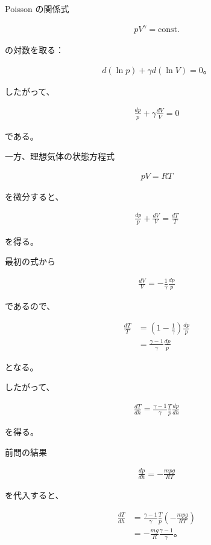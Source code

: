 \documentclass[platex,dvipdfmx,a4paper]{jsarticle}
\begin{document}
Poisson の関係式

\begin{align*}
pV^\gamma
=
\mathrm{const.}
\end{align*}

の対数を取る：

\begin{align*}
d(\ln p)
+
\gamma d(\ln V)
=
0。
\end{align*}

したがって、

\begin{align*}
\frac{dp}{p}
+
\gamma\frac{dV}{V}
=
0
\end{align*}

である。

一方、理想気体の状態方程式

\begin{align*}
pV=RT
\end{align*}

を微分すると、

\begin{align*}
\frac{dp}{p}
+
\frac{dV}{V}
=
\frac{dT}{T}
\end{align*}

を得る。

最初の式から

\begin{align*}
\frac{dV}{V}
=
-\frac1\gamma
\frac{dp}{p}
\end{align*}

であるので、

\begin{align*}
\frac{dT}{T}
&=
\left(
1-\frac1\gamma
\right)
\frac{dp}{p}
\\
&=
\frac{\gamma-1}{\gamma}
\frac{dp}{p}
\end{align*}

となる。

したがって、

\begin{align*}
\frac{dT}{dh}
=
\frac{\gamma-1}{\gamma}
\frac{T}{p}
\frac{dp}{dh}
\end{align*}

を得る。

前問の結果

\begin{align*}
\frac{dp}{dh}
=
-\frac{mpg}{RT}
\end{align*}

を代入すると、

\begin{align*}
\frac{dT}{dh}
&=
\frac{\gamma-1}{\gamma}
\frac{T}{p}
\left(
-\frac{mpg}{RT}
\right)
\\
&=
-\frac{mg}{R}
\frac{\gamma-1}{\gamma}。
\end{align*}
\end{document}
